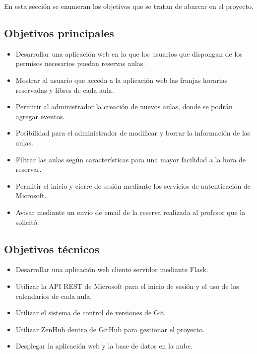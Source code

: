 
En esta sección se enumeran los objetivos que se tratan de abarcar en el proyecto.

\subsection{Objetivos principales}

\begin{itemize}
	\item Desarrollar una aplicación web en la que los usuarios que dispongan de los permisos necesarios puedan reservas aulas.
	\item Mostrar al usuario que acceda a la aplicación web las franjas horarias reservadas y libres de cada aula.
	\item Permitir al administrador la creación de nuevos aulas, donde se podrán agregar eventos.
	\item Posibilidad para el administrador de modificar y borrar la información de las aulas.
	\item Filtrar las aulas según características para una mayor facilidad a la hora de reservar.
	\item Permitir el inicio y cierre de sesión mediante los servicios de autenticación de Microsoft.
	\item Avisar mediante un envío de email de la reserva realizada al profesor que la solicitó.
\end{itemize}

\subsection{Objetivos técnicos}
\begin{itemize}
	\item Desarrollar una aplicación web cliente servidor mediante Flask.
	\item Utilizar la API REST de Microsoft para el inicio de sesión y el uso de los calendarios de cada aula.
	\item Utilizar el sistema de control de versiones de Git.
	\item Utilizar ZenHub dentro de GitHub para gestionar el proyecto.
	\item Desplegar la aplicación web y la base de datos en la nube.
\end{itemize}
